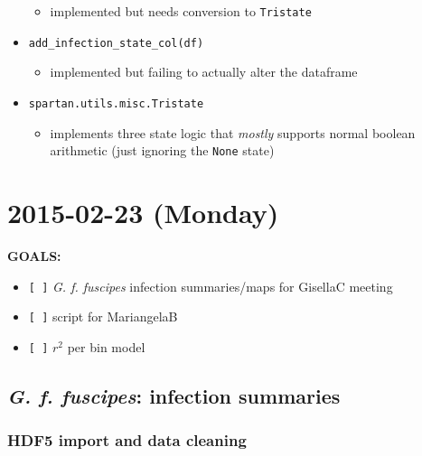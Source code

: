 \documentclass[letterpaper]{scrartcl}
\begin{document}
\begin{itemize}
  \begin{itemize}
  \itemsep1pt\parskip0pt
  \item
    implemented but needs conversion to \texttt{Tristate}
  \end{itemize}
\item
  \texttt{add\_infection\_state\_col(df)}

  \begin{itemize}
  \itemsep1pt\parskip0pt
  \item
    implemented but failing to actually alter the dataframe
  \end{itemize}
\item
  \texttt{spartan.utils.misc.Tristate}

  \begin{itemize}
  \itemsep1pt\parskip0pt
  \item
    implements three state logic that \emph{mostly} supports normal
    boolean arithmetic (just ignoring the \texttt{None} state)
  \end{itemize}
\end{itemize}

\section{2015-02-23 (Monday)}\label{monday-3}

\textbf{GOALS:}

\begin{itemize}
\itemsep1pt\parskip0pt
\item
  \texttt{{[} {]}} \emph{G. f. fuscipes} infection summaries/maps for
  GisellaC meeting
\item
  \texttt{{[} {]}} script for MariangelaB
\item
  \texttt{{[} {]}} \(r^2\) per bin model
\end{itemize}

\subsection{\emph{G. f. fuscipes}: infection
summaries}\label{g.-f.-fuscipes-infection-summaries-3}

\subsubsection{HDF5 import and data
cleaning}\label{hdf5-import-and-data-cleaning-1}
\end{document}
